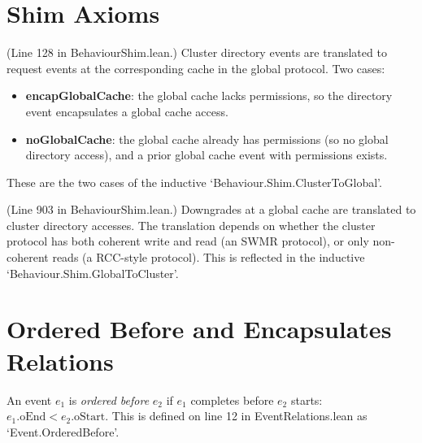 \section{Shim Axioms}
\label{sec:axioms:shim}

\begin{definition}
  \label{def:ShimClusterToGlobal}
  \leanok
  (Line 128 in BehaviourShim.lean.)
  Cluster directory events are translated to request events at the
  corresponding cache in the global protocol. Two cases:
  \begin{itemize}
    \item \textbf{encapGlobalCache}: the global cache lacks permissions,
      so the directory event encapsulates a global cache access.
    \item \textbf{noGlobalCache}: the global cache already has permissions
      (so no global directory access), and a prior global cache event with permissions exists.
  \end{itemize}
  These are the two cases of the inductive `Behaviour.Shim.ClusterToGlobal'.
\end{definition}

\begin{definition}
  \label{def:ShimGlobalToCluster}
  \leanok
  (Line 903 in BehaviourShim.lean.)
  Downgrades at a global cache are translated to cluster directory accesses.
  The translation depends on whether the cluster protocol has both coherent
  write and read (an SWMR protocol), or only non-coherent reads (a RCC-style protocol).
  This is reflected in the inductive `Behaviour.Shim.GlobalToCluster'.
\end{definition}

\section{Ordered Before and Encapsulates Relations}
\label{sec:temporal-event-relations}

\begin{definition}
  \label{def:OrderedBefore}
  \leanok
  An event $e_1$ is \emph{ordered before} $e_2$ if $e_1$ completes before $e_2$
  starts: $e_1.\mathrm{oEnd} < e_2.\mathrm{oStart}$.
  This is defined on line 12 in EventRelations.lean as `Event.OrderedBefore'.
\end{definition}

